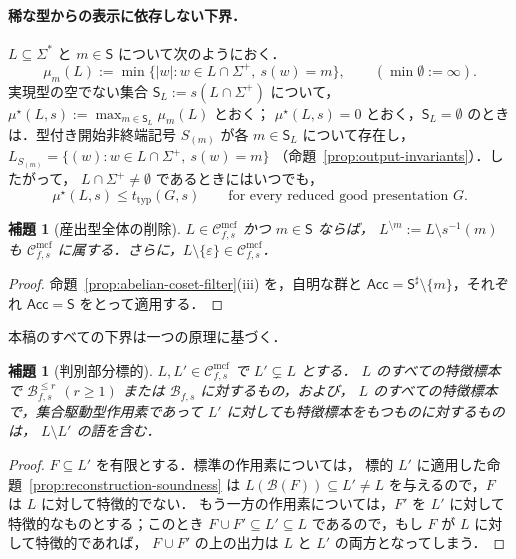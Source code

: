 \documentclass[11pt,a4paper]{ltjsarticle}
\numberwithin{equation}{section}
\theoremstyle{plain}
\newtheorem{lemma}[theorem]{補題}
\theoremstyle{definition}
\theoremstyle{remark}
\newcommand{\Cmcf}[2]{\mathcal{C}^{\mathrm{mcf}}_{#1,#2}}
\newcommand{\eps}{\varepsilon}
\theoremstyle{plain}
\begin{document}
\paragraph{稀な型からの表示に依存しない下界．}
$L\subseteq\Sigma^*$ と $m\in\mathsf S$ について次のようにおく．
\[
 \mu_m(L):=\min\{|w|:w\in L\cap\Sigma^+,\ s(w)=m\},
 \qquad (\min\emptyset:=\infty).
\]
実現型の空でない集合 $\mathsf S_L:=s(L\cap\Sigma^+)$ について，
$\mu^\star(L,s):=\max_{m\in \mathsf S_L}\mu_m(L)$ とおく；
$\mu^\star(L,s)=0$ とおく，$\mathsf S_L=\emptyset$ のときは．型付き開始非終端記号
$S_{(m)}$ が各 $m\in \mathsf S_L$ について存在し，
$L_{S_{(m)}}=\{(w):w\in L\cap\Sigma^+,\ s(w)=m\}$
（命題~\ref{prop:output-invariants}）．したがって，
$L\cap\Sigma^+\ne\emptyset$ であるときにはいつでも，
\begin{equation}\label{eq:root-thickness}
 \mu^\star(L,s)\le t_{\mathrm{typ}}(G,s)
 \qquad\text{for every reduced good presentation }G.
\end{equation}

\begin{lemma}[産出型全体の削除]
\label{lem:type-deletion}
$L\in\Cmcf{f}{s}$ かつ $m\in\mathsf S$ ならば，
$L^{\setminus m}:=L\setminus s^{-1}(m)$ も
$\Cmcf{f}{s}$ に属する．さらに，$L\setminus\{\eps\}\in\Cmcf{f}{s}$．
\end{lemma}

\begin{proof}
命題~\ref{prop:abelian-coset-filter}(iii) を，自明な群と
$\mathsf{Acc}=\mathsf S^\sharp\setminus\{m\}$，それぞれ $\mathsf{Acc}=\mathsf S$ をとって適用する．
\end{proof}

本稿のすべての下界は一つの原理に基づく．

\begin{lemma}[判別部分標的]
\label{lem:distinguishing}
$L,L'\in\Cmcf{f}{s}$ で $L'\subsetneq L$ とする．
$L$ のすべての特徴標本で $\mathcal B^{\le r}_{f,s}$ $(r\ge1)$ または $\mathcal B_{f,s}$ に対するもの，および，
$L$ のすべての特徴標本で，集合駆動型作用素であって $L'$ に対しても特徴標本をもつものに対するものは，
$L\setminus L'$ の語を含む．
\end{lemma}

\begin{proof}
$F\subseteq L'$ を有限とする．標準の作用素については，
標的 $L'$ に適用した命題~\ref{prop:reconstruction-soundness} は
$L(\mathcal B(F))\subseteq L'\ne L$ を与えるので，$F$ は $L$ に対して特徴的でない．
もう一方の作用素については，$F'$ を $L'$ に対して特徴的なものとする；このとき
$F\cup F'\subseteq L'\subseteq L$ であるので，もし $F$ が $L$ に対して特徴的であれば，
$F\cup F'$ の上の出力は $L$ と $L'$ の両方となってしまう．
\end{proof}
\end{document}
